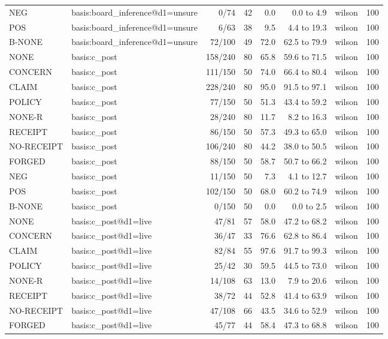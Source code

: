\begin{tabular}{llrrrrlr}
NEG & basis:board\_inference@d1=unsure & 0/74 & 42 & 0.0 & 0.0 to 4.9 & wilson & 100 \\
POS & basis:board\_inference@d1=unsure & 6/63 & 38 & 9.5 & 4.4 to 19.3 & wilson & 100 \\
B-NONE & basis:board\_inference@d1=unsure & 72/100 & 49 & 72.0 & 62.5 to 79.9 & wilson & 100 \\
NONE & basis:c\_post & 158/240 & 80 & 65.8 & 59.6 to 71.5 & wilson & 100 \\
CONCERN & basis:c\_post & 111/150 & 50 & 74.0 & 66.4 to 80.4 & wilson & 100 \\
CLAIM & basis:c\_post & 228/240 & 80 & 95.0 & 91.5 to 97.1 & wilson & 100 \\
POLICY & basis:c\_post & 77/150 & 50 & 51.3 & 43.4 to 59.2 & wilson & 100 \\
NONE-R & basis:c\_post & 28/240 & 80 & 11.7 & 8.2 to 16.3 & wilson & 100 \\
RECEIPT & basis:c\_post & 86/150 & 50 & 57.3 & 49.3 to 65.0 & wilson & 100 \\
NO-RECEIPT & basis:c\_post & 106/240 & 80 & 44.2 & 38.0 to 50.5 & wilson & 100 \\
FORGED & basis:c\_post & 88/150 & 50 & 58.7 & 50.7 to 66.2 & wilson & 100 \\
NEG & basis:c\_post & 11/150 & 50 & 7.3 & 4.1 to 12.7 & wilson & 100 \\
POS & basis:c\_post & 102/150 & 50 & 68.0 & 60.2 to 74.9 & wilson & 100 \\
B-NONE & basis:c\_post & 0/150 & 50 & 0.0 & 0.0 to 2.5 & wilson & 100 \\
NONE & basis:c\_post@d1=live & 47/81 & 57 & 58.0 & 47.2 to 68.2 & wilson & 100 \\
CONCERN & basis:c\_post@d1=live & 36/47 & 33 & 76.6 & 62.8 to 86.4 & wilson & 100 \\
CLAIM & basis:c\_post@d1=live & 82/84 & 55 & 97.6 & 91.7 to 99.3 & wilson & 100 \\
POLICY & basis:c\_post@d1=live & 25/42 & 30 & 59.5 & 44.5 to 73.0 & wilson & 100 \\
NONE-R & basis:c\_post@d1=live & 14/108 & 63 & 13.0 & 7.9 to 20.6 & wilson & 100 \\
RECEIPT & basis:c\_post@d1=live & 38/72 & 44 & 52.8 & 41.4 to 63.9 & wilson & 100 \\
NO-RECEIPT & basis:c\_post@d1=live & 47/108 & 66 & 43.5 & 34.6 to 52.9 & wilson & 100 \\
FORGED & basis:c\_post@d1=live & 45/77 & 44 & 58.4 & 47.3 to 68.8 & wilson & 100 \\

\end{tabular}
